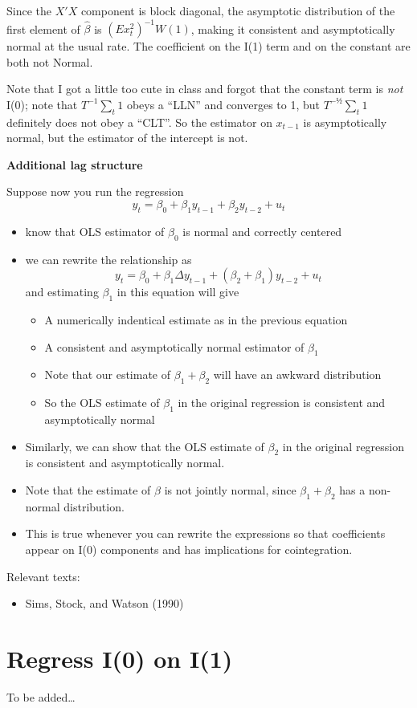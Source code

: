 Since the $X'X$ component is block diagonal, the asymptotic distribution
of the first element of $\hat β$ is $(E x_t^2)^{-1} W(1)$, making it
consistent and asymptotically normal at the usual rate. The coefficient
on the I(1) term and on the constant are both not Normal.

Note that I got a little too cute in class and forgot that the constant
term is \emph{not} I(0); note that $T^{-1} \sum_t 1$ obeys a ``LLN'' and
converges to 1, but $T^{-½} \sum_t 1$ definitely does not obey a ``CLT''.
So the estimator on $x_{t-1}$ is asymptotically normal, but the
estimator of the intercept is not.

\textbf{Additional lag structure}

Suppose now you run the regression
\[y_t = β_0 + β_1 y_{t-1} + β_2 y_{t-2} + u_t\]

\begin{itemize}
\item know that OLS estimator of $β_0$ is normal and correctly centered
\item we can rewrite the relationship as
  \[y_t = β_0 + β_1 Δy_{t-1} + (β_2 + β_1) y_{t-2} + u_t\] and
  estimating $β_1$ in this equation will give

  \begin{itemize}
  \item A numerically indentical estimate as in the previous equation
  \item A consistent and asymptotically normal estimator of $β_1$
  \item Note that our estimate of $β_1 + β_2$ will have an awkward
    distribution
  \item So the OLS estimate of $β_1$ in the original regression is
    consistent and asymptotically normal
  \end{itemize}
\item Similarly, we can show that the OLS estimate of $β_2$ in the
  original regression is consistent and asymptotically normal.
\item Note that the estimate of $β$ is not jointly normal, since
  $β_1+β_2$ has a non-normal distribution.
\item This is true whenever you can rewrite the expressions so that
  coefficients appear on I(0) components and has implications for
  cointegration.
\end{itemize}

Relevant texts:
\begin{itemize}
\item Sims, Stock, and Watson (1990)
\end{itemize}

\section{Regress I(0) on I(1)}
To be added\ldots

